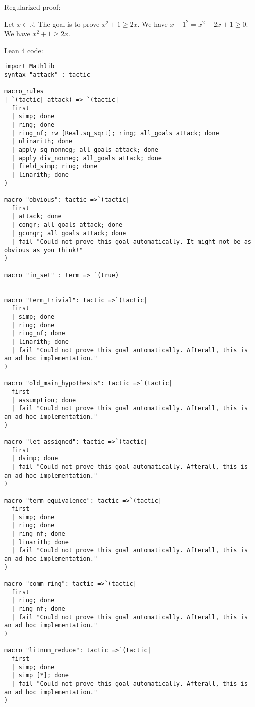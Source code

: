 \documentclass{article}
\begin{document}
Regularized proof:
\begin{tcolorbox}[colback=red!10, width=\linewidth]
Let $x\in\mathbb{R}$.
The goal is to prove $x^2 + 1 \ge 2x$.
We have ${{x-1}}^2 = x^2 - 2x + 1 \ge 0$.
We have $x^2 + 1 \ge 2x$.
\end{tcolorbox}

Lean 4 code:
\begin{tcolorbox}[colback=white!10, width=\linewidth]
\begin{lstlisting}[language=Lean4]
import Mathlib
syntax "attack" : tactic

macro_rules
| `(tactic| attack) => `(tactic|
  first
  | simp; done
  | ring; done
  | ring_nf; rw [Real.sq_sqrt]; ring; all_goals attack; done
  | nlinarith; done
  | apply sq_nonneg; all_goals attack; done
  | apply div_nonneg; all_goals attack; done
  | field_simp; ring; done
  | linarith; done
)

macro "obvious": tactic =>`(tactic|
  first
  | attack; done
  | congr; all_goals attack; done
  | gcongr; all_goals attack; done
  | fail "Could not prove this goal automatically. It might not be as obvious as you think!"
)

macro "in_set" : term => `(true)


macro "term_trivial": tactic =>`(tactic|
  first
  | simp; done
  | ring; done
  | ring_nf; done
  | linarith; done
  | fail "Could not prove this goal automatically. Afterall, this is an ad hoc implementation."
)

macro "old_main_hypothesis": tactic =>`(tactic|
  first
  | assumption; done
  | fail "Could not prove this goal automatically. Afterall, this is an ad hoc implementation."
)

macro "let_assigned": tactic =>`(tactic|
  first
  | dsimp; done
  | fail "Could not prove this goal automatically. Afterall, this is an ad hoc implementation."
)

macro "term_equivalence": tactic =>`(tactic|
  first
  | simp; done
  | ring; done
  | ring_nf; done
  | linarith; done
  | fail "Could not prove this goal automatically. Afterall, this is an ad hoc implementation."
)

macro "comm_ring": tactic =>`(tactic|
  first
  | ring; done
  | ring_nf; done
  | fail "Could not prove this goal automatically. Afterall, this is an ad hoc implementation."
)

macro "litnum_reduce": tactic =>`(tactic|
  first
  | simp; done
  | simp [*]; done
  | fail "Could not prove this goal automatically. Afterall, this is an ad hoc implementation."
)


\end{lstlisting}
\end{tcolorbox}
\end{document}
